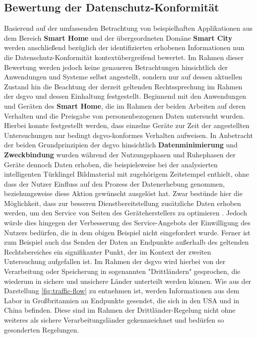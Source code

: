 \subsection{Bewertung der Datenschutz-Konformität}
\label{sec:Analyse der Datenerhebungt:ssec:Datenschutz-Konformität}
Basierend auf der umfassenden Betrachtung von beispielhaften Applikationen aus dem Bereich \textbf{Smart Home} und der übergeordneten Domäne \textbf{Smart City} werden anschließend bezüglich der identifizierten erhobenen Informationen nun die Datenschutz-Konformität kontextübergreifend bewertet. Im Rahmen dieser Bewertung werden jedoch keine genaueren Betrachtungen hinsichtlich der Anwendungen und Systeme selbst angestellt, sondern nur auf dessen aktuellen Zustand hin die Beachtung der derzeit geltenden Rechtssprechung im Rahmen der \ac{dsgvo} und dessen Einhaltung festgestellt.
Beginnend mit den Anwendungen und Geräten des \textbf{Smart Home}, die im Rahmen der beiden Arbeiten \cite{Mandalari2021,Ren2019} auf deren Verhalten und die Preisgabe von personenbezogenen Daten untersucht wurden. Hierbei konnte festgestellt werden, dass einzelne Geräte zur Zeit der angestellten Untersuchungen nur bedingt \ac{dsgvo}-konformes Verhalten aufweisen. In Anbetracht der beiden Grundprinzipien der \ac{dsgvo} hinsichtlich \textbf{Datenminimierung} und \textbf{Zweckbindung} wurden während der Nutzungsphasen und Ruhephasen der Geräte dennoch Daten erhoben, die beispielsweise bei der analysierten intelligenten Türklingel Bildmaterial mit zugehörigem Zeitstempel enthielt, ohne dass der Nutzer Einfluss auf den Prozess der Datenerhebung genommen, beziehungsweise diese Aktion gewünscht ausgelöst hat. Zwar bestünde hier die Möglichkeit, dass zur besseren Dienstbereitstellung zusätzliche Daten erhoben werden, um den Service von Seiten des Geräteherstellers zu optimieren \cite{Bastos2019}. Jedoch würde dies hingegen der Verbesserung des Service-Angebots der Einwilligung des Nutzers bedürfen, die in dem obigen Beispiel nicht eingefordert wurde. Ferner ist zum Beispiel auch das Senden der Daten an Endpunkte außerhalb des geltenden Rechtsbereiches ein signifikanter Punkt, der im Kontext der zweiten Untersuchung aufgefallen ist. 
Im Rahmen der \ac{dsgvo} wird hierbei von der Verarbeitung oder Speicherung in sogenannten "Drittländern" \cite{dsgvo2016} gesprochen, die wiederum in sichere und unsichere Länder unterteilt werden können. Wie aus der Darstellung \ref{fig:traffic-flow} zu entnehmen ist, werden Informationen aus dem Labor in Großbritannien an Endpunkte gesendet, die sich in den USA und in China befinden. Diese sind im Rahmen der Drittländer-Regelung nicht ohne weiteres als sichere Verarbeitungsländer gekennzeichnet und bedürfen so gesonderten Regelungen. 
